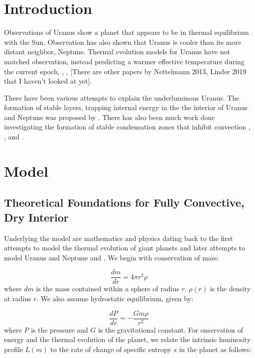 \documentclass[11pt]{ucscthesisbs}
\begin{document}
\chapter{Introduction}
Observations of Uranus show a planet that appears to be in thermal equilibrium with the Sun. Observation has also shown that Uranus is cooler than its more distant neighbor, Neptune. Thermal evolution models for Uranus have not matched observation, instead predicting a warmer effective temperature during the current epoch\citep{fortney_2011}, \citep{podolak_1991}, \citep{hubbard_1995}, \citep{scheibe_2019} [There are other papers by Nettelmann 2013, Linder 2019 that I haven't looked at yet]. 

There have been various attempts to explain the underluminous Uranus. The formation of stable layers, trapping internal energy in the the interior of Uranus and Neptune was proposed by \citep{podolak_1991}. There has also been much work done investigating the formation of stable condensation zones that inhibit convection \citep{friedson_2017}, \citep{leconte_2017}, and \citep{guillot_1995}. 


\chapter{Model}

\section{Theoretical Foundations for Fully Convective, Dry Interior}
Underlying the model are mathematics and physics dating back to the first attempts to model the thermal evolution of giant planets \citep{hubbard_1977} and later attempts to model Uranus and Neptune \citep{hubbard_1977_2} and \citep{podolak_1991}. We begin with conservation of mass:

\begin{equation}
  \frac{dm}{dr} =4 \pi r^{2}\rho  
\end{equation}
where $dm$ is the mass contained within a sphere of radius $r$. $\rho(r)$ is the density at radius $r$. We also assume hydrostatic equilibrium, given by:

\begin{equation}
  \frac{dP}{dr} = -\frac{Gm\rho}{r^{2}}  
\end{equation}
where $P$ is the pressure and $G$ is the gravitational constant. For onservation of energy and the thermal evolution of the planet, we relate the intrinsic luminosity profile $L(m)$ to the rate of change of specific entropy $s$ in the planet as follows:
\end{document}

